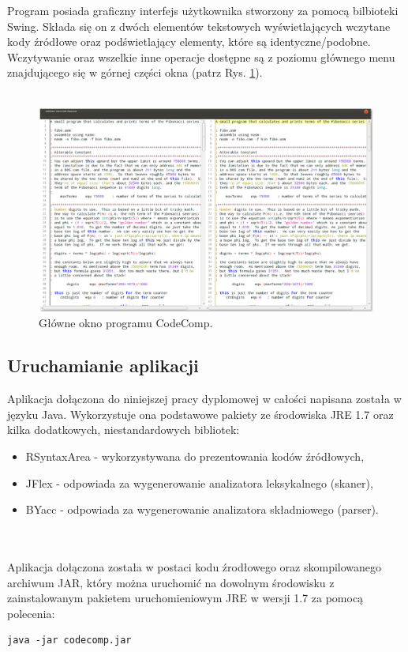 \documentclass[a4paper,12pt,twoside]{article}
\begin{document}
\pagebreak

Program posiada graficzny interfejs użytkownika stworzony za pomocą bilbioteki Swing. Składa się on z dwóch elementów tekstowych wyświetlających wczytane kody źródłowe oraz podświetlający elementy, które są identyczne/podobne. Wczytywanie oraz wszelkie inne operacje dostępne są z poziomu głównego menu znajdującego się w górnej części okna (patrz Rys. \ref{fig:main}).
\\ \\
\begin{figure}[!h]
\centering
\includegraphics[scale=0.33]{gfx/main_window.png}
\caption{Główne okno programu CodeComp.}
\label{fig:main}
\end{figure}

\newpage

\subsection{Uruchamianie aplikacji}

Aplikacja dołączona do niniejszej pracy dyplomowej w całości napisana została w języku Java. Wykorzystuje ona podstawowe pakiety ze środowiska JRE 1.7 oraz kilka dodatkowych, niestandardowych bibliotek:
\begin{itemize}
\item RSyntaxArea - wykorzystywana do prezentowania kodów źródłowych,
\item JFlex - odpowiada za wygenerowanie analizatora leksykalnego (skaner),
\item BYacc - odpowiada za wygenerowanie analizatora składniowego (parser).
\end{itemize}
\\ \\
Aplikacja dołączona została w postaci kodu źrodłowego oraz skompilowanego archiwum JAR, który można uruchomić na dowolnym środowisku z zainstalowanym pakietem uruchomieniowym JRE w wersji 1.7 za pomocą polecenia:
\\
\begin{lstlisting}[numbers=none, xleftmargin=0]
java -jar codecomp.jar
\end{lstlisting}
\end{document}
